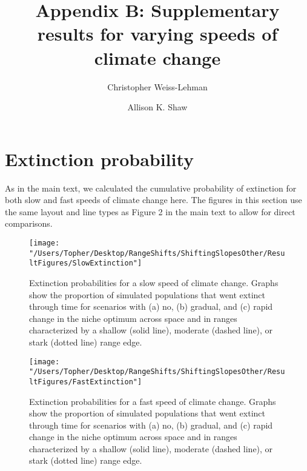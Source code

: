 \documentclass[12pt, oneside]{article}
\title{Appendix B: Supplementary results for varying speeds of climate change}
\date{}
\author[1]{Christopher Weiss-Lehman}
\author[1]{Allison K. Shaw}
\affil[1]{Ecology, Evolution, and Behavior, University of Minnesota}
\begin{document}
\maketitle

\doublespacing
\linenumbers

\renewcommand{\thefigure}{B\arabic{figure}}
\renewcommand{\thetable}{B\arabic{table}}
\renewcommand{\theequation}{B\arabic{equation}}

\section*{Extinction probability}
As in the main text, we calculated the cumulative probability of extinction for both slow and fast speeds of climate change here. The figures in this section use the same layout and line types as Figure 2 in the main text to allow for direct comparisons.

\begin{figure}
\centering
\texttt{[image: "/Users/Topher/Desktop/RangeShifts/ShiftingSlopesOther/ResultFigures/SlowExtinction"]}
\vspace{-5mm}
\caption[LoF entry]{Extinction probabilities for a slow speed of climate change. Graphs show the proportion of simulated populations that went extinct through time for scenarios with (a) no, (b) gradual, and (c) rapid change in the niche optimum across space and in ranges characterized by a shallow (solid line), moderate (dashed line), or stark (dotted line) range edge.}
\label{fig:ExtProbSlow}
\end{figure}

\begin{figure}
\centering
\texttt{[image: "/Users/Topher/Desktop/RangeShifts/ShiftingSlopesOther/ResultFigures/FastExtinction"]}
\vspace{-5mm}
\caption[LoF entry]{Extinction probabilities for a fast speed of climate change. Graphs show the proportion of simulated populations that went extinct through time for scenarios with (a) no, (b) gradual, and (c) rapid change in the niche optimum across space and in ranges characterized by a shallow (solid line), moderate (dashed line), or stark (dotted line) range edge.}
\label{fig:ExtProbFast}
\end{figure}

\newpage
\end{document}
